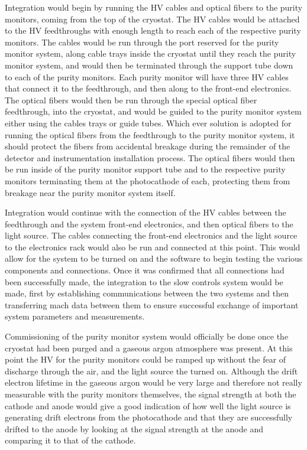 Integration would begin by running the HV cables and optical fibers to the purity monitors, coming from the top of the cryostat.  The HV cables would be attached to the HV feedthroughs with enough length to reach each of the respective purity monitors.  The cables would be run through the port reserved for the purity monitor system, along cable trays inside the cryostat until they reach the purity monitor system, and would then be terminated through the support tube down to each of the purity monitors.  Each purity monitor will have three HV cables that connect it to the feedthrough, and then along to the front-end electronics.  The optical fibers would then be run through the special optical fiber feedthrough, into the cryostat, and would be guided to the purity monitor system either using the cables trays or guide tubes.  Which ever solution is adopted for running the optical fibers from the feedthrough to the purity monitor system, it should protect the fibers from accidental breakage during the remainder of the detector and instrumentation installation process.  The optical fibers would then be run inside of the purity monitor support tube and to the respective purity monitors terminating them at the photocathode of each, protecting them from breakage near the purity monitor system itself.

Integration would continue with the connection of the HV cables between the feedthrough and the system front-end electronics, and then optical fibers to the light source.  The cables connecting the front-end electronics and the light source to the electronics rack would also be run and connected at this point.  This would allow for the system to be turned on and the software to begin testing the various components and connections.  Once it was confirmed that all connections had been successfully made, the integration to the slow controls system would be made, first by establishing communications between the two systems and then transferring mach data between them to ensure successful exchange of important system parameters and measurements.  

Commissioning of the purity monitor system would officially be done once the cryostat had been purged and a gaseous argon atmosphere was present.  At this point the HV for the purity monitors could be ramped up without the fear of discharge through the air, and the light source the turned on.  Although the drift electron lifetime in the gaseous argon would be very large and therefore not really measurable with the purity monitors themselves, the signal strength at both the cathode and anode would give a good indication of how well the light source is generating drift electrons from the photocathode and that they are successfully drifted to the anode by looking at the signal strength at the anode and comparing it to that of the cathode.




